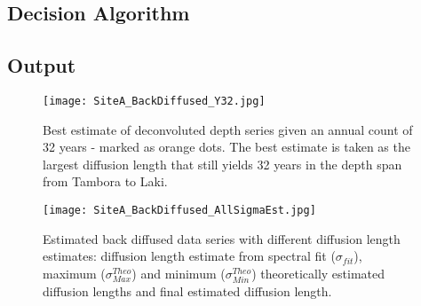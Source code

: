 \documentclass[../../CompleteThesis/Complete_1stDraft.tex]{subfiles}
\begin{document}
\subsection[Decision algorithm]{Decision Algorithm}

\subsection[Output]{Output}


\begin{figure}
	\centering
	\texttt{[image: SiteA\_BackDiffused\_Y32.jpg]}
	\caption[Best estimate of deconvoluted depth series, Site A]{Best estimate of deconvoluted depth series given an annual count of 32 years - marked as orange dots. The best estimate is taken as the largest diffusion length that still yields 32 years in the depth span from Tambora to Laki.}
	\label{fig:SiteA_BackDiffused_Y32}
\end{figure}

\begin{figure}
	\centering
	\texttt{[image: SiteA\_BackDiffused\_AllSigmaEst.jpg]}
	\caption[All diffusion length estimate deconvolutions, Site A]{Estimated back diffused data series with different diffusion length estimates: diffusion length estimate from spectral fit ($\sigma_{fit}$), maximum ($\sigma_{Max}^{Theo}$) and minimum ($\sigma_{Min}^{Theo}$) theoretically estimated diffusion lengths and final estimated diffusion length.}
	\label{fig:SiteA_BackDiffused_AllSigmaEst}
\end{figure}
\end{document}
